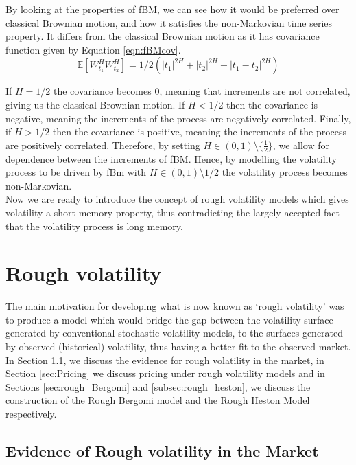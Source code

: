 \documentclass[12pt,oneside]{article}
\begin{document}
 By looking at the properties of fBM, we can see how it would be preferred over classical Brownian motion, and how it satisfies the non-Markovian time series property. It differs from the classical Brownian motion as it has covariance function given by Equation \ref{eqn:fBMcov}.
\begin{equation}
\label{eqn:fBMcov}
\mathbb{E}[W^H_{t_1}W^H_{t_2}]=1/2(|t_1|^{2H}+|t_2|^{2H}-|t_1-t_2|^{2H})
\end{equation}

If $H=1/2$ the covariance becomes 0, meaning that increments are not correlated, giving us the classical Brownian motion. If $H<1/2$ then the covariance is negative, meaning the increments of the process are negatively correlated. Finally, if $H>1/2$ then the covariance is positive, meaning the increments of the process are positively correlated. Therefore, by setting $H\in(0,1)\setminus\{\frac{1}{2}\}$, we allow for dependence between the increments of fBM. Hence, by modelling the volatility process to be driven by fBm with $H\in(0,1)\setminus{1/2}$ the volatility process becomes non-Markovian.
\\

Now we are ready to introduce the concept of rough volatility models which gives volatility a short memory property, thus contradicting the largely accepted fact that the volatility process is long memory. %

\section{Rough volatility}
\label{sec:rough_volatility}

The main motivation for developing what is now known as `rough volatility' was to produce a model which would bridge the gap between the volatility surface generated by conventional stochastic volatility models, to the surfaces generated by observed (historical) volatility, thus having a better fit to the observed market.
\\

In Section \ref{sec:rough_vol_evidence}, we discuss the evidence for rough volatility in the market, in Section \ref{sec:Pricing} we discuss pricing under rough volatility models and in Sections \ref{sec:rough_Bergomi} and \ref{subsec:rough_heston}, we discuss the construction of the Rough Bergomi model and the Rough Heston Model respectively. 

\subsection{Evidence of Rough volatility in the Market}
\label{sec:rough_vol_evidence}
 
\end{document}
